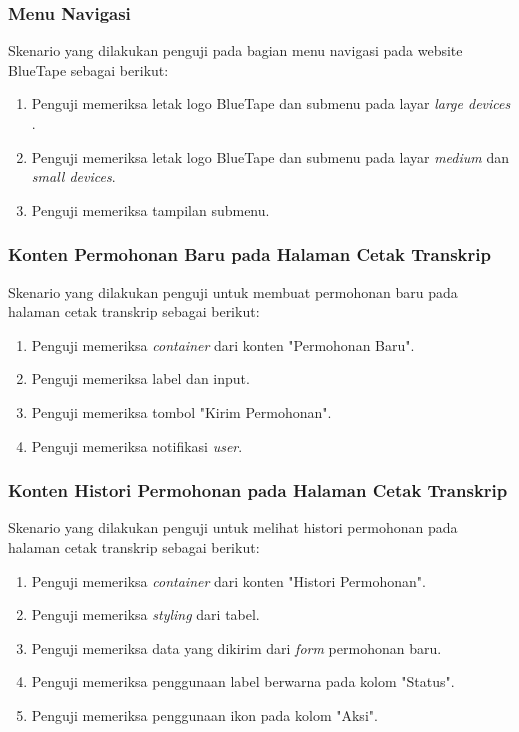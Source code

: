 \subsubsection{Menu Navigasi}
Skenario yang dilakukan penguji pada bagian menu navigasi pada website BlueTape sebagai berikut:
\begin{enumerate}
	\item Penguji memeriksa letak logo BlueTape dan submenu pada layar \textit{large devices} .
	\item Penguji memeriksa letak logo BlueTape dan submenu pada layar \textit{medium} dan \textit{small devices}.	
	\item Penguji memeriksa tampilan submenu.
\end{enumerate}

\subsubsection{Konten Permohonan Baru pada Halaman Cetak Transkrip}
Skenario yang dilakukan penguji untuk membuat permohonan baru pada halaman cetak transkrip sebagai berikut:
\begin{enumerate}
	\item Penguji memeriksa \textit{container} dari konten "Permohonan Baru".
	\item Penguji memeriksa label dan input.
	\item Penguji memeriksa tombol "Kirim Permohonan".	
	\item Penguji memeriksa notifikasi \textit{user}.
\end{enumerate}

\subsubsection{Konten Histori Permohonan pada Halaman Cetak Transkrip}
Skenario yang dilakukan penguji untuk melihat histori permohonan pada halaman cetak transkrip sebagai berikut:
\begin{enumerate}
	\item Penguji memeriksa \textit{container} dari konten "Histori Permohonan".
	\item Penguji memeriksa \textit{styling} dari tabel.	
	\item Penguji memeriksa data yang dikirim dari \textit{form} permohonan baru.
	\item Penguji memeriksa penggunaan label berwarna pada kolom "Status".		
	\item Penguji memeriksa penggunaan ikon pada kolom "Aksi".	
\end{enumerate}

